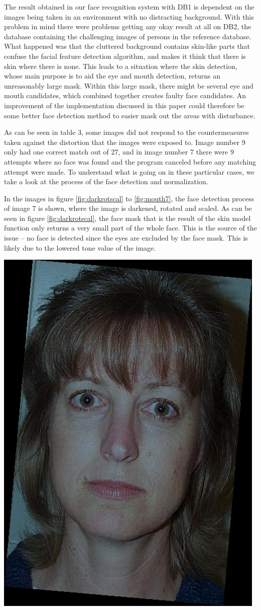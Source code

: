 The result obtained in our face recognition system with DB1 is dependent on the images being taken in an environment with no distracting background. With this problem in mind there were problems getting any okay result at all on DB2, the database containing the challenging images of persons in the reference database. What happened was that the cluttered background contains skin-like parts that confuse the facial feature detection algorithm, and makes it think that there is skin where there is none. This leads to a situation where the skin detection, whose main purpose is to aid the eye and mouth detection, returns an unreasonably large mask. Within this large mask, there might be several eye and mouth candidates, which combined together creates faulty face candidates. An improvement of the implementation discussed in this paper could therefore be some better face detection method to easier mask out the areas with disturbance.

As can be seen in table 3, some images did not respond to the countermeasures taken against the distortion that the images were exposed to. Image number 9 only had one correct match out of 27, and in image number 7 there were 9 attempts where no face was found and the program canceled before any matching attempt were made. To understand what is going on in these particular cases, we take a look at the process of the face detection and normalization.

In the images in figure \ref{fig:darkrotscal} to \ref{fig:mouth7}, the face detection process of image 7 is shown, where the image is darkened, rotated and scaled. As can be seen in figure \ref{fig:darkrotscal}, the face mask that is the result of the skin model function only returns a very small part of the whole face. This is the source of the issue – no face is detected since the eyes are excluded by the face mask. This is likely due to the lowered tone value of the image.

\begin{Figure}
  \centering
    \includegraphics[width=0.5\columnwidth]{images/im7_img.jpg}
\end{Figure}

